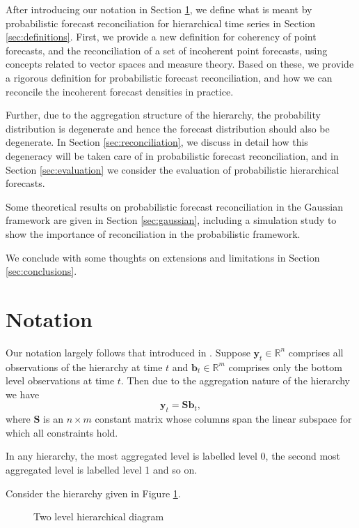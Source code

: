 \documentclass[a4paper, 11pt]{article}
\begin{document}
After introducing our notation in Section \ref{sec:notation}, we define what is meant by probabilistic forecast reconciliation for hierarchical time series in Section \ref{sec:definitions}. First, we provide a new definition for coherency of point forecasts, and the reconciliation of a set of incoherent point forecasts, using  concepts related to vector spaces and measure theory. Based on these, we provide a rigorous definition for probabilistic forecast reconciliation, and how we can reconcile the incoherent forecast densities in practice. 

Further, due to the aggregation structure of the hierarchy, the probability distribution is degenerate and hence the forecast distribution should also be degenerate. In Section \ref{sec:reconciliation}, we discuss in detail how this degeneracy will be taken care of in probabilistic forecast reconciliation, and in Section \ref{sec:evaluation} we consider the evaluation of probabilistic hierarchical forecasts. 

Some theoretical results on probabilistic forecast reconciliation in the Gaussian framework are given in Section \ref{sec:gaussian}, including a simulation study to show the importance of reconciliation in the probabilistic framework. 

We conclude with some thoughts on extensions and limitations in Section \ref{sec:conclusions}.


\section{Notation}\label{sec:notation}

Our notation largely follows that introduced in \citet{Wickramasuriya2017}. Suppose $\bm{y}_t \in \mathbb{R}^n$ comprises all observations of the hierarchy at time $t$ and $\bm{b}_t \in \mathbb{R}^m$ comprises only the bottom level observations at time $t$. Then due to the aggregation nature of the hierarchy we have
\begin{equation}
  \bm{y}_t = \bm{Sb}_t,
\end{equation}
where $\bm{S}$ is an $n \times m$ constant matrix whose columns span the linear subspace for which all constraints hold.  

In any hierarchy, the most aggregated level is labelled level 0, the second most aggregated level is labelled level 1 and so on. 

Consider the hierarchy given in Figure \ref{fig1}. 

\begin{figure}[H]
  \begin{center}
      
     
    \qobitree
  \end{center}
  \caption{Two level hierarchical diagram}\label{fig1}
\end{figure}
\end{document}
